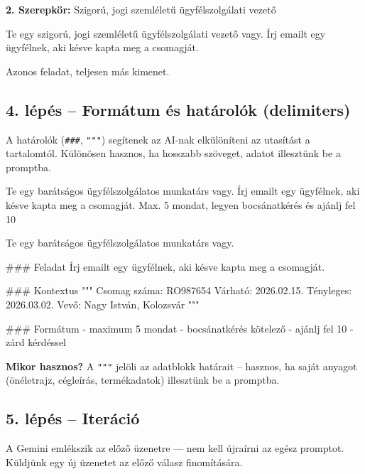 \documentclass[11pt,a4paper]{article}
\newcommand{\tip}[1]{%
  \vspace{3pt}%
  \begin{tcolorbox}[tipstyle]%
  \textbf{\textcolor{tipborder}{Mikor hasznos?}} #1%
  \end{tcolorbox}\vspace{2pt}}
\newcommand{\lbl}[1]{\vspace{6pt}\noindent{\small\bfseries\textcolor{labelcolor}{#1}}\par\smallskip}
\begin{document}
\noindent\textbf{2. Szerepkör:} Szigorú, jogi szemléletű ügyfélszolgálati vezető

\begin{prompt}
Te egy szigorú, jogi szemléletű ügyfélszolgálati vezető vagy.
Írj emailt egy ügyfélnek, aki késve kapta meg a csomagját.
\end{prompt}

\noindent Azonos feladat, teljesen más kimenet.

\subsection{4. lépés -- Formátum és határolók (delimiters)}

\noindent A határolók (\texttt{\#\#\#}, \texttt{"""}) segítenek az AI-nak elkülöníteni az utasítást a tartalomtól. Különösen hasznos, ha hosszabb szöveget, adatot illesztünk be a promptba.

\lbl{Határolók nélkül}
\begin{prompt}
Te egy barátságos ügyfélszolgálatos munkatárs vagy. Írj emailt
egy ügyfélnek, aki késve kapta meg a csomagját. Max. 5 mondat,
legyen bocsánatkérés és ajánlj fel 10%
\end{prompt}

\lbl{Határolókkal strukturálva}
\begin{prompt}
Te egy barátságos ügyfélszolgálatos munkatárs vagy.

### Feladat
Írj emailt egy ügyfélnek, aki késve kapta meg a csomagját.

### Kontextus
"""
Csomag száma: RO987654
Várható: 2026.02.15.   
Tényleges: 2026.03.02.
Vevő: Nagy István, Kolozsvár
"""

### Formátum
- maximum 5 mondat
- bocsánatkérés kötelező
- ajánlj fel 10%
- zárd kérdéssel
\end{prompt}

\tip{A \texttt{"""} jelöli az adatblokk határait -- hasznos, ha saját anyagot (önéletrajz, cégleírás, termékadatok) illesztünk be a promptba.}

\subsection{5. lépés -- Iteráció}

\noindent A Gemini emlékszik az előző üzenetre — nem kell újraírni az egész promptot. Küldjünk egy új üzenetet az előző válasz finomítására.
\end{document}
